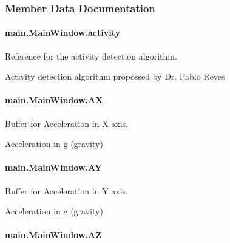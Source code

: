 \subsubsection{Member Data Documentation}
\hypertarget{classmain_1_1_main_window_a79bfc498bc7afae5335f0afa0457424c}{
\paragraph[{activity}]{\setlength{\rightskip}{0pt plus 5cm}main.\-Main\-Window.\-activity}}\label{classmain_1_1_main_window_a79bfc498bc7afae5335f0afa0457424c}


Reference for the activity detection algorithm. 

Activity detection algorithm propossed by Dr. Pablo Reyes \hypertarget{classmain_1_1_main_window_a4bc63f3f953ad9110ea895e0b277e263}{
\paragraph[{A\-X}]{\setlength{\rightskip}{0pt plus 5cm}main.\-Main\-Window.\-A\-X}}\label{classmain_1_1_main_window_a4bc63f3f953ad9110ea895e0b277e263}


Buffer for Acceleration in X axis. 

Acceleration in g (gravity) \hypertarget{classmain_1_1_main_window_a0dd8435606fc6f9398de1c3759a5253e}{
\paragraph[{A\-Y}]{\setlength{\rightskip}{0pt plus 5cm}main.\-Main\-Window.\-A\-Y}}\label{classmain_1_1_main_window_a0dd8435606fc6f9398de1c3759a5253e}


Buffer for Acceleration in Y axis. 

Acceleration in g (gravity) \hypertarget{classmain_1_1_main_window_aab50e3554ab90b750539200250578e0b}{
\paragraph[{A\-Z}]{\setlength{\rightskip}{0pt plus 5cm}main.\-Main\-Window.\-A\-Z}}\label{classmain_1_1_main_window_aab50e3554ab90b750539200250578e0b}


